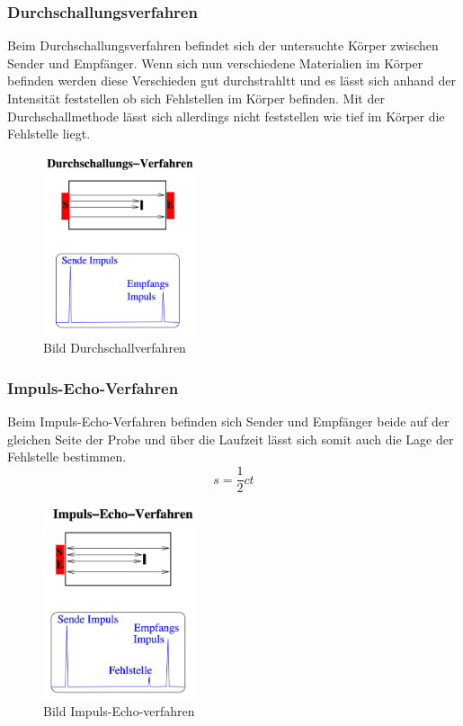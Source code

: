 \subsubsection{Durchschallungsverfahren}
Beim Durchschallungsverfahren befindet sich der untersuchte Körper zwischen Sender und Empfänger.
Wenn sich nun verschiedene Materialien im Körper befinden werden diese Verschieden gut durchstrahltt und es lässt sich anhand der Intensität feststellen ob sich Fehlstellen im Körper befinden.
Mit der Durchschallmethode lässt sich allerdings nicht feststellen wie tief im Körper die Fehlstelle liegt.
\begin{figure}[H]
    \centering
    \includegraphics[width=0.4\textwidth]{bilder/Durchschallungs-Verfahren.png}
    \caption{Bild Durchschallverfahren}
\end{figure}
\subsubsection{Impuls-Echo-Verfahren}
Beim Impuls-Echo-Verfahren befinden sich Sender und Empfänger beide auf der gleichen Seite der Probe und über die Laufzeit lässt sich somit auch die Lage der Fehlstelle bestimmen.
\begin{equation}
    s = \frac{1}{2}ct \nonumber
\end{equation}
\begin{figure}[H]
    \centering
    \includegraphics[width=0.4\textwidth]{bilder/Impuls-Echo-Verfahren.png}
    \caption{Bild Impuls-Echo-verfahren}
\end{figure}
